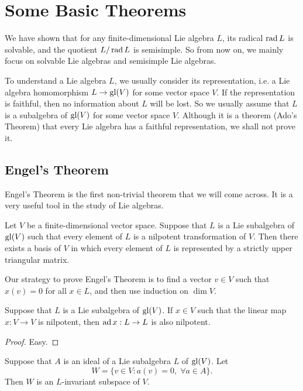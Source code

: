 \chapter{Some Basic Theorems}
We have shown that for any finite-dimensional Lie algebra $L$, its radical $\operatorname{rad} L$ is solvable, and the quotient $L/\operatorname{rad} L$ is semisimple. So from now on, we mainly focus on solvable Lie algebras and semisimple Lie algebras.

To understand a Lie algebra $L$, we usually consider its representation, i.e. a Lie algebra homomorphism $L\to \mathrm{gl}(V)$ for some vector space $V$. If the representation is faithful, then no information about $L$ will be lost. So we usually assume that $L$ is a subalgebra of $\mathrm{gl}(V)$ for some vector space $V$. Although it is a theorem (Ado's Theorem) that every Lie algebra has a faithful representation, we shall not prove it.

\section{Engel's Theorem}

Engel's Theorem is the first non-trivial theorem that we will come across. It is a very useful tool in the study of Lie algebras.

\begin{thm}
    Let $V$ be a finite-dimensional vector space. Suppose that $L$ is a Lie subalgebra of $\mathrm{gl}(V)$ such that every element of $L$ is a nilpotent transformation of $V$. Then there exists a basis of $V$ in which every element of $L$ is represented by a strictly upper triangular matrix.
\end{thm}

Our strategy to prove Engel's Theorem is to find a vector $v\in V$ such that $x(v)=0$ for all $x\in L$, and then use induction on $\dim V$.

\begin{lem}\label{ad_is_nilpotent}
    Suppose that $L$ is a Lie subalgebra of $\mathrm{gl}(V)$. If $x\in V$ such that the linear map $x:V\to V$ is nilpotent, then $\operatorname{ad} x:L\to L$ is also nilpotent.
\end{lem}

\begin{proof}
    Easy.
\end{proof}

\begin{lem}\label{invariance_lemma_0}
    Suppose that $A$ is an ideal of a Lie subalgebra $L$ of $\mathrm{gl}(V)$. Let 
    \[
        W=\{v\in V:a(v)=0,\;\forall a\in A\}.
    \]
    Then $W$ is an $L$-invariant subspace of $V$.
\end{lem}

